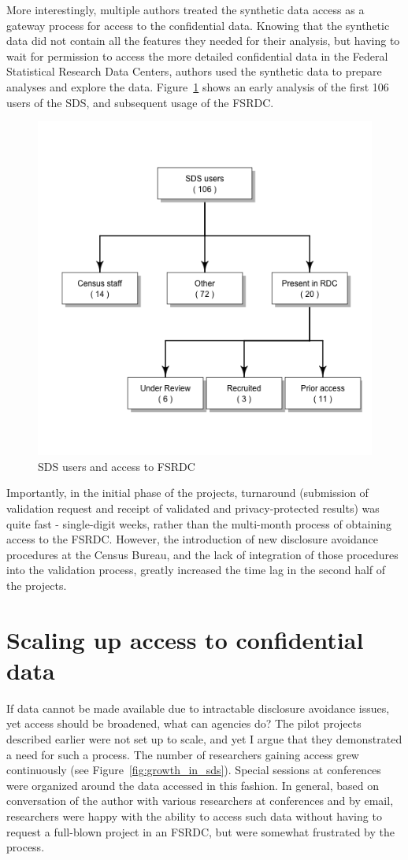 \documentclass[]{hdsr}
\begin{document}
More interestingly, multiple authors treated the synthetic data access as a gateway process for access to the confidential data. Knowing that the synthetic data did not contain all the features they needed for their analysis, but having to wait for permission to access the more detailed confidential data in the Federal Statistical Research Data Centers, authors used the synthetic data to prepare analyses and explore the data. Figure~\ref{fig:useRDC} shows an early analysis of the first 106 users of the SDS, and subsequent usage of the FSRDC. 

\begin{figure}
    \centering
    \includegraphics[width=0.5\linewidth]{figs/useRDCgraph.png}
    \caption{SDS users and access to FSRDC}
    \label{fig:useRDC}
\end{figure}

Importantly, in the initial phase of the projects, turnaround (submission of validation request and receipt of validated and privacy-protected results) was quite fast - single-digit weeks, rather than the multi-month process of obtaining access to the FSRDC. However, the introduction of new disclosure avoidance procedures at the Census Bureau, and the lack of integration of those procedures into the validation process, greatly increased the time lag in the second half of the projects.

\section{Scaling up access to confidential data}

If data cannot be made available due to intractable disclosure avoidance issues, yet access should be broadened, what can agencies do? 
The pilot projects described earlier were not set up to scale, and yet I argue that  they demonstrated  a need for such a process. The number of researchers gaining access grew continuously (see Figure~\ref{fig:growth_in_sds}). Special sessions at conferences were organized around the data accessed in this fashion. In general, based on conversation of the author with various researchers at conferences and by email, researchers were happy with the ability to access such data without having to request a full-blown project in an FSRDC, but were somewhat frustrated by the process. 
\end{document}
